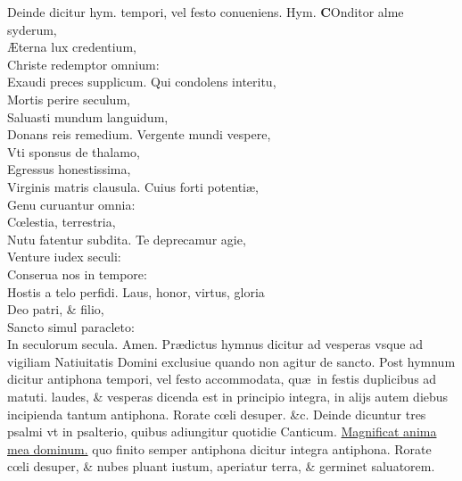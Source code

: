 \documentclass[a5paper,10pt]{book}
\def\ae{æ}
\def\AE{Æ}
\def\oe{œ}
\begin{document}
\begin{multicols*}{2}
\newline {} \color{red} Deinde dicitur hym. tempori, vel festo conueniens. Hym. \color{black}
\vspace{-.25em}
\lettrine[lines=2]{\bfseries \color{red} C}{}Onditor alme syderum,\\ \AE terna lux credentium,\\Christe redemptor omnium:\\Exaudi preces supplicum.
\newline \color{red} Q\color{black}ui condolens interitu,\\Mortis perire seculum,\\Saluasti mundum languidum,\\Donans reis remedium.
\newline \color{red} V\color{black}ergente mundi vespere,\\Vti sponsus de thalamo,\\Egressus honestissima,\\Virginis matris clausula.
\newline \color{red} C\color{black}uius forti potenti\ae ,\\Genu curuantur omnia:\\C\oe lestia, terrestria,\\Nutu fatentur subdita.
\newline \color{red} T\color{black}e deprecamur agie,\\Venture iudex seculi:\\Conserua nos in tempore:\\Hostis a telo perfidi.
\newline \color{red} L\color{black}aus, honor, virtus, gloria\\Deo patri, \& filio,\\Sancto simul paracleto:\\In seculorum secula. Amen.
\newline {} \color{red} Pr\ae dictus hymnus dicitur ad vesperas vsque ad vigiliam Natiuitatis Domini exclusiue quando non agitur de sancto. \color{black}
\newline {} \color{red} Post hymnum dicitur antiphona tempori, vel festo accommodata, qu\ae \ in festis duplicibus ad matuti. laudes, \& vesperas dicenda est in principio integra, in alijs autem diebus incipienda tantum antiphona. \color{black} Rorate c\oe li desuper. \&c. \color{red} Deinde dicuntur tres psalmi vt in psalterio, quibus adiungitur quotidie Canticum. \color{black} \hyperlink{Magnificat}{Magnificat anima mea dominum.} \color{red} quo finito semper antiphona dicitur integra antiphona. \color{black} Rorate c\oe li desuper, \& nubes pluant iustum, aperiatur terra, \& germinet saluatorem.

\end{multicols*}
\end{document}
